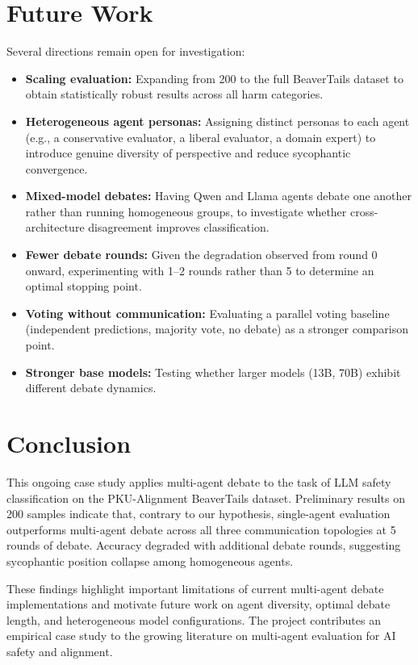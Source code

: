 \documentclass[11pt,a4paper]{article}
\begin{document}
\section{Future Work}

Several directions remain open for investigation:

\begin{itemize}
  \item \textbf{Scaling evaluation:} Expanding from 200 to the full BeaverTails dataset to obtain statistically robust results across all harm categories.
  \item \textbf{Heterogeneous agent personas:} Assigning distinct personas to each agent (e.g., a conservative evaluator, a liberal evaluator, a domain expert) to introduce genuine diversity of perspective and reduce sycophantic convergence.
  \item \textbf{Mixed-model debates:} Having Qwen and Llama agents debate one another rather than running homogeneous groups, to investigate whether cross-architecture disagreement improves classification.
  \item \textbf{Fewer debate rounds:} Given the degradation observed from round 0 onward, experimenting with 1--2 rounds rather than 5 to determine an optimal stopping point.
  \item \textbf{Voting without communication:} Evaluating a parallel voting baseline (independent predictions, majority vote, no debate) as a stronger comparison point.
  \item \textbf{Stronger base models:} Testing whether larger models (13B, 70B) exhibit different debate dynamics.
\end{itemize}

\section{Conclusion}

This ongoing case study applies multi-agent debate to the task of LLM safety classification on the PKU-Alignment BeaverTails dataset. Preliminary results on 200 samples indicate that, contrary to our hypothesis, single-agent evaluation outperforms multi-agent debate across all three communication topologies at 5 rounds of debate. Accuracy degraded with additional debate rounds, suggesting sycophantic position collapse among homogeneous agents.

These findings highlight important limitations of current multi-agent debate implementations and motivate future work on agent diversity, optimal debate length, and heterogeneous model configurations. The project contributes an empirical case study to the growing literature on multi-agent evaluation for AI safety and alignment.
\end{document}
